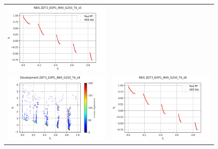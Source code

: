 \begin{figure}[H]
\begin{tabular}{c c}
    \includegraphics[scale=0.5]{figures/ZDT3_EOP1_N40_G250_T6/s5_nds.png}\\
    \includegraphics[scale=0.5]{figures/ZDT3_EOP1_N40_G250_T6/s8_dev.png} &
    \includegraphics[scale=0.5]{figures/ZDT3_EOP1_N40_G250_T6/s8_nds.png}\\

\end{tabular}
\end{figure}

